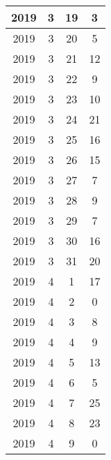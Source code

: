 \begin{longtable} {|c|c|c|c|}
\hline
2019         & 3            & 19           & 3                         \\ 
\hline
2019         & 3            & 20           & 5                         \\ 
\hline
2019         & 3            & 21           & 12                        \\ 
\hline
2019         & 3            & 22           & 9                         \\ 
\hline
2019         & 3            & 23           & 10                        \\ 
\hline
2019         & 3            & 24           & 21                        \\ 
\hline
2019         & 3            & 25           & 16                        \\ 
\hline
2019         & 3            & 26           & 15                        \\ 
\hline
2019         & 3            & 27           & 7                         \\ 
\hline
2019         & 3            & 28           & 9                         \\ 
\hline
2019         & 3            & 29           & 7                         \\ 
\hline
2019         & 3            & 30           & 16                        \\ 
\hline
2019         & 3            & 31           & 20                        \\ 
\hline
2019         & 4            & 1            & 17                        \\ 
\hline
2019         & 4            & 2            & 0                         \\ 
\hline
2019         & 4            & 3            & 8                         \\ 
\hline
2019         & 4            & 4            & 9                         \\ 
\hline
2019         & 4            & 5            & 13                        \\ 
\hline
2019         & 4            & 6            & 5                         \\ 
\hline
2019         & 4            & 7            & 25                        \\ 
\hline
2019         & 4            & 8            & 23                        \\ 
\hline
2019         & 4            & 9            & 0                         \\ 

\end{longtable}
